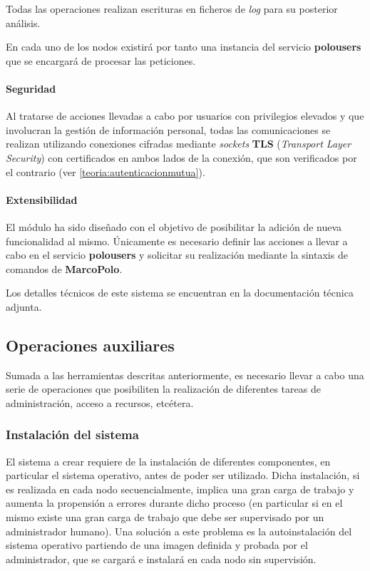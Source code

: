 Todas las operaciones realizan escrituras en ficheros de \textit{log} para su posterior análisis.

En cada uno de los nodos existirá por tanto una instancia del servicio \textbf{polousers} que se encargará de procesar las peticiones.

\paragraph{Seguridad\\}

Al tratarse de acciones llevadas a cabo por usuarios con privilegios elevados y que involucran la gestión de información personal, todas las comunicaciones se realizan utilizando conexiones cifradas mediante \textit{sockets} \textbf{TLS} (\textit{Transport Layer Security}) con certificados en ambos lados de la conexión, que son verificados por el contrario (ver \ref{teoria:autenticacionmutua}).

\paragraph{Extensibilidad\\}

El módulo ha sido diseñado con el objetivo de posibilitar la adición de nueva funcionalidad al mismo. Únicamente es necesario definir las acciones a llevar a cabo en el servicio \textbf{polousers} y solicitar su realización mediante la sintaxis de comandos de \textbf{MarcoPolo}.

\vspace{2cm}

Los detalles técnicos de este sistema se encuentran en la documentación técnica adjunta.


\subsection{Operaciones auxiliares}

Sumada a las herramientas descritas anteriormente, es necesario llevar a cabo una serie de operaciones que posibiliten la realización de diferentes tareas de administración, acceso a recursos, etcétera.

\subsubsection{Instalación del sistema}

El sistema a crear requiere de la instalación de diferentes componentes, en particular el sistema operativo, antes de poder ser utilizado. Dicha instalación, si es realizada en cada nodo secuencialmente, implica una gran carga de trabajo y aumenta la propensión a errores durante dicho proceso (en particular si en el mismo existe una gran carga de trabajo que debe ser supervisado por un administrador humano). Una solución a este problema es la autoinstalación del sistema operativo partiendo de una imagen definida y probada por el administrador, que se cargará e instalará en cada nodo sin supervisión.

